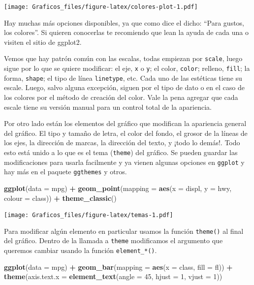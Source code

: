 \documentclass[]{book}
\newenvironment{Shaded}{\begin{snugshade}}{\end{snugshade}}
\newcommand{\DataTypeTok}[1]{\textcolor[rgb]{0.13,0.29,0.53}{#1}}
\newcommand{\DecValTok}[1]{\textcolor[rgb]{0.00,0.00,0.81}{#1}}
\newcommand{\KeywordTok}[1]{\textcolor[rgb]{0.13,0.29,0.53}{\textbf{#1}}}
\newcommand{\NormalTok}[1]{#1}
\newcommand{\OperatorTok}[1]{\textcolor[rgb]{0.81,0.36,0.00}{\textbf{#1}}}
\newcommand{\StringTok}[1]{\textcolor[rgb]{0.31,0.60,0.02}{#1}}
\theoremstyle{definition}
\theoremstyle{definition}
\theoremstyle{definition}
\theoremstyle{remark}
\begin{document}
\texttt{[image: Graficos\_files/figure-latex/colores-plot-1.pdf]}

Hay muchas más opciones disponibles, ya que como dice el dicho: ``Para
gustos, los colores''. Si quieren conocerlas te recomiendo que lean la
ayuda de cada una o visiten el sitio de ggplot2.

Vemos que hay patrón común con las escalas, todas empiezan por
\texttt{scale}, luego sigue por lo que se quiere modificar: el eje,
\texttt{x} o \texttt{y}; el color, \texttt{color}; relleno,
\texttt{fill}; la forma, \texttt{shape}; el tipo de línea
\texttt{linetype}, etc. Cada uno de las estéticas tiene su escale.
Luego, salvo alguna excepción, siguen por el tipo de dato o en el caso
de los colores por el método de creación del color. Vale la pena agregar
que cada escale tiene su versión manual para un control total de la
apariencia.

Por otro lado están los elementos del gráfico que modifican la
apariencia general del gráfico. El tipo y tamaño de letra, el color del
fondo, el grosor de la líneas de los ejes, la dirección de marcas, la
dirección del texto, y ¡todo lo demás!. Todo esto está unido a lo que es
el tema (\texttt{theme}) del gráfico. Se pueden guardar las
modificaciones para usarla facilmente y ya vienen algunas opciones en
\texttt{ggplot} y hay más en el paquete \texttt{ggthemes} y otros.

\begin{Shaded}
\begin{Highlighting}[]
\KeywordTok{ggplot}\NormalTok{(}\DataTypeTok{data =}\NormalTok{ mpg) }\OperatorTok{+}
\StringTok{  }\KeywordTok{geom_point}\NormalTok{(}\DataTypeTok{mapping =} \KeywordTok{aes}\NormalTok{(}\DataTypeTok{x =}\NormalTok{ displ, }\DataTypeTok{y =}\NormalTok{ hwy, }\DataTypeTok{colour =}\NormalTok{ class)) }\OperatorTok{+}
\StringTok{  }\KeywordTok{theme_classic}\NormalTok{()}
\end{Highlighting}
\end{Shaded}

\texttt{[image: Graficos\_files/figure-latex/temas-1.pdf]}

Para modificar algún elemento en particular usamos la función
\texttt{theme()} al final del gráfico. Dentro de la llamada a
\texttt{theme} modificamos el argumento que queremos cambiar usando la
función \texttt{element\_*()}.

\begin{Shaded}
\begin{Highlighting}[]
\KeywordTok{ggplot}\NormalTok{(}\DataTypeTok{data =}\NormalTok{ mpg) }\OperatorTok{+}
\StringTok{  }\KeywordTok{geom_bar}\NormalTok{(}\DataTypeTok{mapping =} \KeywordTok{aes}\NormalTok{(}\DataTypeTok{x =}\NormalTok{ class, }\DataTypeTok{fill =}\NormalTok{ fl)) }\OperatorTok{+}
\StringTok{  }\KeywordTok{theme}\NormalTok{(}\DataTypeTok{axis.text.x =} \KeywordTok{element_text}\NormalTok{(}\DataTypeTok{angle =} \DecValTok{45}\NormalTok{, }\DataTypeTok{hjust =} \DecValTok{1}\NormalTok{, }\DataTypeTok{vjust =} \DecValTok{1}\NormalTok{))}
\end{Highlighting}
\end{Shaded}
\end{document}
